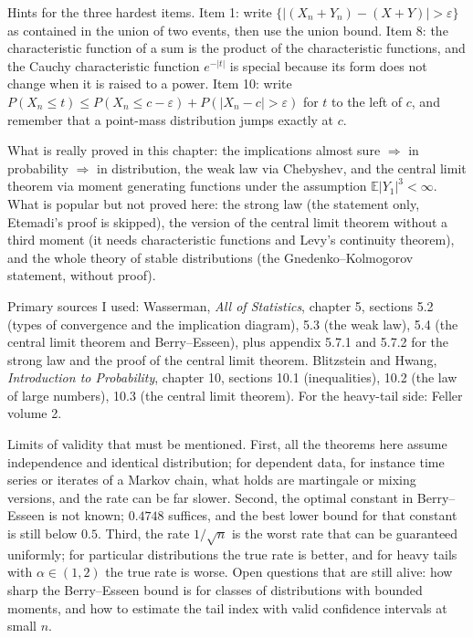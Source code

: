 \begin{latihan}
Hints for the three hardest items. Item 1: write
$\{|(X_n+Y_n)-(X+Y)|>\varepsilon\}$ as contained in the union of two events, then use
the union bound. Item 8: the characteristic function of a sum is the product of the
characteristic functions, and the Cauchy characteristic function $e^{-|t|}$ is
special because its form does not change when it is raised to a power. Item 10: write
$P(X_n\le t)\le P(X_n\le c-\varepsilon)+P(|X_n-c|>\varepsilon)$ for $t$ to the left
of $c$, and remember that a point-mass distribution jumps exactly at $c$.
\end{latihan}

\begin{untukpeneliti}
What is really proved in this chapter: the implications almost sure $\Rightarrow$ in
probability $\Rightarrow$ in distribution, the weak law via Chebyshev, and the
central limit theorem via moment generating functions under the assumption
$\mathbb{E}|Y_1|^3<\infty$. What is popular but not proved here: the strong law (the
statement only, Etemadi's proof is skipped), the version of the central limit theorem
without a third moment (it needs characteristic functions and Levy's continuity
theorem), and the whole theory of stable distributions (the Gnedenko--Kolmogorov
statement, without proof).

Primary sources I used: Wasserman, \emph{All of Statistics}, chapter 5, sections 5.2
(types of convergence and the implication diagram), 5.3 (the weak law), 5.4 (the
central limit theorem and Berry--Esseen), plus appendix 5.7.1 and 5.7.2 for the strong
law and the proof of the central limit theorem. Blitzstein and Hwang,
\emph{Introduction to Probability}, chapter 10, sections 10.1 (inequalities), 10.2
(the law of large numbers), 10.3 (the central limit theorem). For the heavy-tail
side: Feller volume 2.

Limits of validity that must be mentioned. First, all the theorems here assume
independence and identical distribution; for dependent data, for instance time series
or iterates of a Markov chain, what holds are martingale or mixing versions, and the
rate can be far slower. Second, the optimal constant in Berry--Esseen is not known;
$0.4748$ suffices, and the best lower bound for that constant is still below
$0.5$. Third, the rate $1/\sqrt n$ is the worst rate that can be guaranteed
uniformly; for particular distributions the true rate is better, and for heavy tails
with $\alpha\in(1,2)$ the true rate is worse. Open questions that are still alive:
how sharp the Berry--Esseen bound is for classes of distributions with bounded
moments, and how to estimate the tail index with valid confidence intervals at small
$n$.
\end{untukpeneliti}

